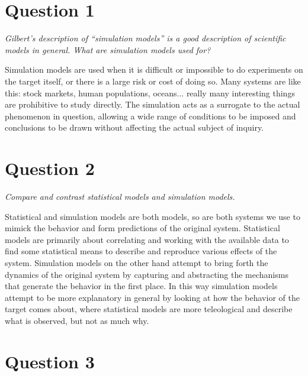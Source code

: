 \documentclass[12pt]{article}
\begin{document}
\maketitle

\section{Question 1}

\emph{Gilbert’s description of “simulation models” is a good description of scientific models in general.  What are simulation models used for?}

\vspace{4pt}

Simulation models are used when it is difficult or impossible to do experiments on the target itself, or there is a large risk or cost of doing so.  Many systems are like this: stock markets, human populations, oceans... really many interesting things are prohibitive to study directly.  The simulation acts as a surrogate to the actual phenomenon in question, allowing a wide range of conditions to be imposed and conclusions to be drawn without affecting the actual subject of inquiry.

\section{Question 2}

\emph{Compare and contrast statistical models and simulation models.}

\vspace{4pt}

Statistical and simulation models are both models, so are both systems we use to mimick the behavior and form predictions of the original system.  Statistical models are primarily about correlating and working with the available data to find some statistical means to describe and reproduce various effects of the system.  Simulation models on the other hand attempt to bring forth the dynamics of the original system by capturing and abstracting the mechanisms that generate the behavior in the first place.  In this way simulation models attempt to be more explanatory in general by looking at how the behavior of the target comes about, where statistical models are more teleological and describe what is observed, but not as much why.  

\section{Question 3}
\end{document}
